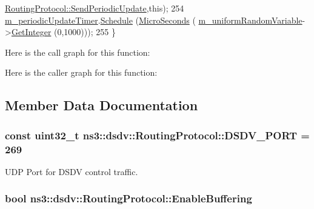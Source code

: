 \begin{DoxyCode}
      \hyperlink{classns3_1_1dsdv_1_1RoutingProtocol_a370e3ca262a505ec0fd30456f82b2aed}{RoutingProtocol::SendPeriodicUpdate},\textcolor{keyword}{this});
254   \hyperlink{classns3_1_1dsdv_1_1RoutingProtocol_a851fbb5569e6681fd1c42f47d2a79ee8}{m\_periodicUpdateTimer}.\hyperlink{classns3_1_1Timer_ac3345d696887578f518b19f359f7f94b}{Schedule} (\hyperlink{group__timecivil_ga17465a639c8d1464e76538afdd78a9f0}{MicroSeconds} (
      \hyperlink{classns3_1_1dsdv_1_1RoutingProtocol_a2d5efde0680b47457d0b94d0493c9eec}{m\_uniformRandomVariable}->\hyperlink{classns3_1_1RandomVariableStream_a66cd94e6305ce7f000f1a9ff0fcb9aef}{GetInteger} (0,1000)));
255 \}
\end{DoxyCode}


Here is the call graph for this function\+:




Here is the caller graph for this function\+:




\subsection{Member Data Documentation}
\subsubsection[{\texorpdfstring{D\+S\+D\+V\+\_\+\+P\+O\+RT}{DSDV_PORT}}]{\setlength{\rightskip}{0pt plus 5cm}const uint32\+\_\+t ns3\+::dsdv\+::\+Routing\+Protocol\+::\+D\+S\+D\+V\+\_\+\+P\+O\+RT = 269\hspace{0.3cm}{\ttfamily [static]}}\hypertarget{classns3_1_1dsdv_1_1RoutingProtocol_a14b063286a3c34efb9537f6456af3271}{}\label{classns3_1_1dsdv_1_1RoutingProtocol_a14b063286a3c34efb9537f6456af3271}


U\+DP Port for D\+S\+DV control traffic. 

\subsubsection[{\texorpdfstring{Enable\+Buffering}{EnableBuffering}}]{\setlength{\rightskip}{0pt plus 5cm}bool ns3\+::dsdv\+::\+Routing\+Protocol\+::\+Enable\+Buffering\hspace{0.3cm}{\ttfamily [private]}}\hypertarget{classns3_1_1dsdv_1_1RoutingProtocol_a257bf2eb6e7eff700d12f00f2d9ec0e3}{}\label{classns3_1_1dsdv_1_1RoutingProtocol_a257bf2eb6e7eff700d12f00f2d9ec0e3}


